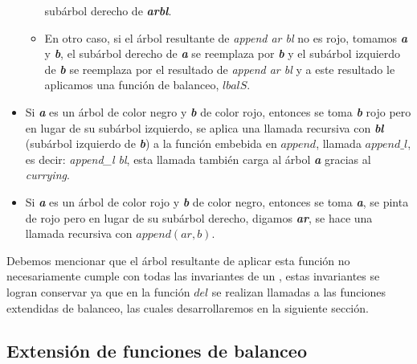 \begin{itemize}
\begin{itemize}
      subárbol derecho de \textbf{\textit{arbl}}.
      \item En otro caso, si el \'arbol resultante de \textit{append ar bl} no es rojo, tomamos 
      \textbf{\textit{a}} y \textbf{\textit{b}}, el subárbol derecho de \textbf{\textit{a}} se 
      reemplaza por \textbf{\textit{b}} y el subárbol izquierdo de \textbf{\textit{b}} se reemplaza 
      por el resultado de \textit{append ar bl} y a este resultado le aplicamos una función de 
      balanceo, \hyperref[lbalS]{$lbalS$}.
    \end{itemize}
    \item Si \textbf{\textit{a}} es un \'arbol de color negro y \textbf{\textit{b}} de color rojo,
    entonces se toma \textbf{\textit{b}} rojo pero en lugar de su subárbol izquierdo, se aplica una 
    llamada recursiva con \textbf{\textit{bl}} (sub\'arbol izquierdo de \textbf{\textit{b}}) a la 
    funci\'on embebida en \hyperref[func_app]{$append$}, llamada $append\_l$, es decir: \textit{append\_l bl}, esta 
    llamada tambi\'en carga al \'arbol \textbf{\textit{a}} gracias al \emph{currying}\cite{Currying}.
    \item Si \textbf{\textit{a}} es un \'arbol de color rojo y \textbf{\textit{b}} de color negro,
    entonces se toma \textbf{\textit{a}}, se pinta de rojo pero en lugar de su subárbol derecho, digamos
    \textbf{\textit{ar}}, se hace una llamada recursiva con $append(ar,b)$.
\end{itemize}

Debemos mencionar que el \'arbol resultante de aplicar esta funci\'on no necesariamente cumple con 
todas las invariantes de un {\arn}, estas invariantes se logran conservar ya que en la funci\'on 
\hyperref[func_del]{$del$} se realizan llamadas a las funciones extendidas de balanceo, las cuales desarrollaremos en la 
siguiente sección.

\subsection{Extensi\'on de funciones de balanceo}

